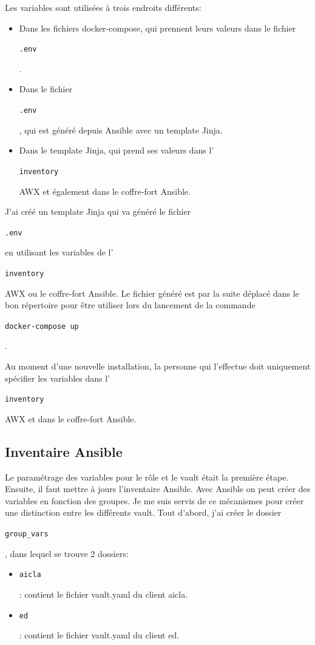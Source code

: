 \documentclass[12pt]{article}
\begin{document}
Les variables sont utilisées à trois endroits différents:
\begin{itemize}
    \item Dans les fichiers docker-compose, qui prennent leurs valeurs dans le fichier \begin{code}\texttt{.env}\end{code}.
    \item Dans le fichier \begin{code}\texttt{.env}\end{code}, qui est généré depuis \gls{Ansible} avec un template \gls{Jinja}.
    \item Dans le template \gls{Jinja}, qui prend ses valeurs dans l'\begin{code}\texttt{inventory}\end{code} AWX et également dans le coffre-fort \gls{Ansible}.
\end{itemize}

J'ai créé un template \gls{Jinja} qui va généré le fichier \begin{code}\texttt{.env}\end{code} en utilisant les variables de l'\begin{code}\texttt{inventory}\end{code} AWX ou le coffre-fort \gls{Ansible}.
Le fichier généré est par la suite déplacé dans le bon répertoire pour être utiliser lors du lancement de la commande \begin{code}\texttt{docker-compose up}\end{code}. 

Au moment d'une nouvelle installation, la personne qui l'effectue doit uniquement spécifier les variables dans l'\begin{code}\texttt{inventory}\end{code} AWX et dans le coffre-fort \gls{Ansible}.

\subsection{Inventaire Ansible}
Le paramétrage des variables pour le rôle et le vault était la première étape. 
Ensuite, il faut mettre à jours l'inventaire \gls{Ansible}.
Avec \gls{Ansible} on peut créer des variables en fonction des groupes.
Je me suis servis de ce mécanismes pour créer une distinction entre les différents vault.
Tout d'abord, j'ai créer le dossier \begin{code}\texttt{group\_vars}\end{code}, dans lequel se trouve 2 dossiers:
\begin{itemize}
    \item  \begin{code}\texttt{aicla}\end{code}: contient le fichier vault.yaml du client aicla.
    \item  \begin{code}\texttt{ed}\end{code}: contient le fichier vault.yaml du client ed.
\end{itemize}
\end{document}

